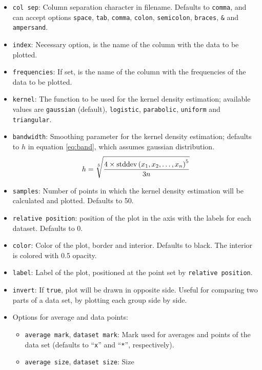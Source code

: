 \documentclass{article}
\begin{document}
\begin{itemize}
	\item \texttt{col sep}: Column separation character in filename.
		Defaults to \texttt{comma}, and can accept options
		\texttt{space}, \texttt{tab}, \texttt{comma},
		\texttt{colon}, \texttt{semicolon}, \texttt{braces},
		\texttt{\&} and \texttt{ampersand}.
	\item \texttt{index}: Necessary option, is the name of the column with
		the data to be plotted.
	\item \texttt{frequencies}: If set, is the name of the column with
		the frequencies of the data to be plotted.
	\item \texttt{kernel}: The function to be used for the kernel density
		estimation; available values are \texttt{gaussian} (default),
		\texttt{logistic}, \texttt{parabolic}, \texttt{uniform}
		and \texttt{triangular}.
	\item \texttt{bandwidth}: Smoothing parameter for the kernel density
		estimation; defaults to $h$ in equation \ref{eq:band},
		which assumes gaussian distribution.
		\begin{equation}
			\label{eq:band}
			h=\sqrt[5]{\frac{4\times\textnormal{stddev}%
			\left(x_1,x_2,\ldots,x_n\right)^5}{3n}}
		\end{equation}
	\item \texttt{samples}: Number of points in which the kernel density
		estimation will be calculated and plotted. Defaults
		to 50.
	\item \texttt{relative position}: position of the plot in the axis
		with the labels for each dataset. Defaults to 0.
	\item \texttt{color}: Color of the plot, border and interior.
		Defaults to black. The interior is colored with 0.5
		opacity.
	\item \texttt{label}: Label of the plot, positioned at the point
		set by \texttt{relative position}.
	\item \texttt{invert}: If \texttt{true}, plot will be drawn in opposite
		side. Useful for comparing two parts of a data set, by plotting each
		group side by side.
	\item Options for average and data points:
	\begin{itemize}
		\item \texttt{average mark}, \texttt{dataset mark}: Mark used
			for averages and points of the data set (defaults
			to ``\texttt{x}'' and ``\texttt{*}'', respectively).
		\item \texttt{average size}, \texttt{dataset size}: Size

\end{itemize}
\end{itemize}
\end{document}
